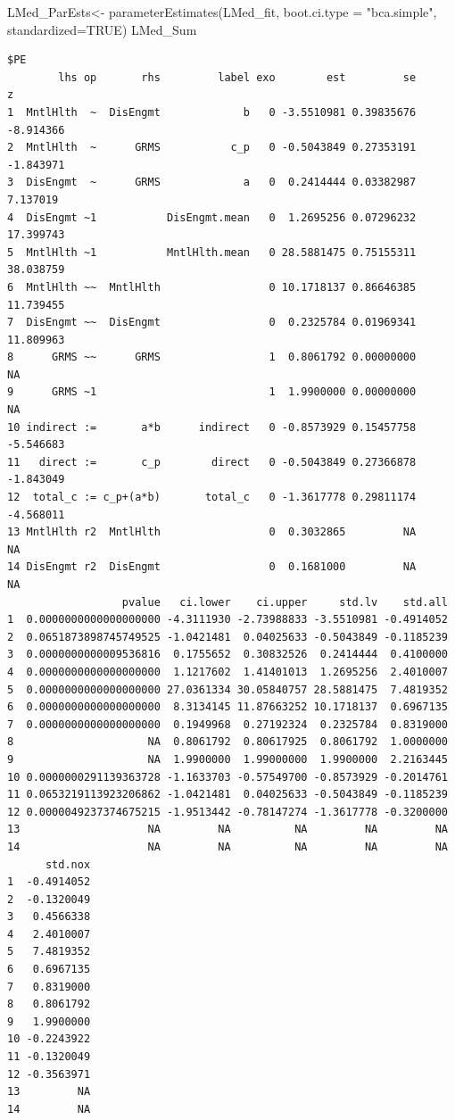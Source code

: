 \documentclass[
  11pt,
]{book}
\newenvironment{Shaded}{\begin{snugshade}}{\end{snugshade}}
\newcommand{\AttributeTok}[1]{\textcolor[rgb]{0.77,0.63,0.00}{#1}}
\newcommand{\ConstantTok}[1]{\textcolor[rgb]{0.00,0.00,0.00}{#1}}
\newcommand{\FunctionTok}[1]{\textcolor[rgb]{0.00,0.00,0.00}{#1}}
\newcommand{\NormalTok}[1]{#1}
\newcommand{\OtherTok}[1]{\textcolor[rgb]{0.56,0.35,0.01}{#1}}
\newcommand{\StringTok}[1]{\textcolor[rgb]{0.31,0.60,0.02}{#1}}
\begin{document}
\begin{Shaded}
\begin{Highlighting}[]
\NormalTok{LMed\_ParEsts}\OtherTok{\textless{}{-}} \FunctionTok{parameterEstimates}\NormalTok{(LMed\_fit, }\AttributeTok{boot.ci.type =} \StringTok{"bca.simple"}\NormalTok{, }\AttributeTok{standardized=}\ConstantTok{TRUE}\NormalTok{)}
\NormalTok{LMed\_Sum}
\end{Highlighting}
\end{Shaded}

\begin{verbatim}
$PE
        lhs op       rhs         label exo        est         se         z
1  MntlHlth  ~  DisEngmt             b   0 -3.5510981 0.39835676 -8.914366
2  MntlHlth  ~      GRMS           c_p   0 -0.5043849 0.27353191 -1.843971
3  DisEngmt  ~      GRMS             a   0  0.2414444 0.03382987  7.137019
4  DisEngmt ~1           DisEngmt.mean   0  1.2695256 0.07296232 17.399743
5  MntlHlth ~1           MntlHlth.mean   0 28.5881475 0.75155311 38.038759
6  MntlHlth ~~  MntlHlth                 0 10.1718137 0.86646385 11.739455
7  DisEngmt ~~  DisEngmt                 0  0.2325784 0.01969341 11.809963
8      GRMS ~~      GRMS                 1  0.8061792 0.00000000        NA
9      GRMS ~1                           1  1.9900000 0.00000000        NA
10 indirect :=       a*b      indirect   0 -0.8573929 0.15457758 -5.546683
11   direct :=       c_p        direct   0 -0.5043849 0.27366878 -1.843049
12  total_c := c_p+(a*b)       total_c   0 -1.3617778 0.29811174 -4.568011
13 MntlHlth r2  MntlHlth                 0  0.3032865         NA        NA
14 DisEngmt r2  DisEngmt                 0  0.1681000         NA        NA
                  pvalue   ci.lower    ci.upper     std.lv    std.all
1  0.0000000000000000000 -4.3111930 -2.73988833 -3.5510981 -0.4914052
2  0.0651873898745749525 -1.0421481  0.04025633 -0.5043849 -0.1185239
3  0.0000000000009536816  0.1755652  0.30832526  0.2414444  0.4100000
4  0.0000000000000000000  1.1217602  1.41401013  1.2695256  2.4010007
5  0.0000000000000000000 27.0361334 30.05840757 28.5881475  7.4819352
6  0.0000000000000000000  8.3134145 11.87663252 10.1718137  0.6967135
7  0.0000000000000000000  0.1949968  0.27192324  0.2325784  0.8319000
8                     NA  0.8061792  0.80617925  0.8061792  1.0000000
9                     NA  1.9900000  1.99000000  1.9900000  2.2163445
10 0.0000000291139363728 -1.1633703 -0.57549700 -0.8573929 -0.2014761
11 0.0653219113923206862 -1.0421481  0.04025633 -0.5043849 -0.1185239
12 0.0000049237374675215 -1.9513442 -0.78147274 -1.3617778 -0.3200000
13                    NA         NA          NA         NA         NA
14                    NA         NA          NA         NA         NA
      std.nox
1  -0.4914052
2  -0.1320049
3   0.4566338
4   2.4010007
5   7.4819352
6   0.6967135
7   0.8319000
8   0.8061792
9   1.9900000
10 -0.2243922
11 -0.1320049
12 -0.3563971
13         NA
14         NA
\end{verbatim}
\end{document}
